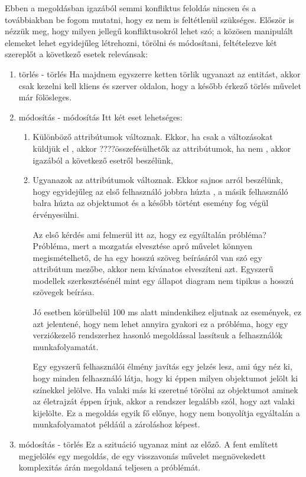 Ebben a megoldásban igazából semmi konfliktus feloldás nincsen és a továbbiakban be fogom mutatni, hogy ez nem is feltétlenül szükséges. Először is nézzük meg, hogy milyen jellegű konfliktusokról lehet szó; a közösen manipulált elemeket lehet egyidejűleg létrehozni, törölni és módosítani, feltételezve két szereplőt a következő esetek relevánsak:

\begin{enumerate}
\item { törlés - törlés} Ha majdnem egyszerre ketten törlik ugyanazt az entitást, akkor csak kezelni kell kliens és szerver oldalon, hogy a később érkező törlés művelet már fölösleges. 
\item { módosítás - módosítás} Itt két eset lehetséges:
\begin{enumerate}
\item Különböző attribútumok változnak. Ekkor, ha csak a változásokat küldjük el , akkor ????összefésülhetők az attribútumok, ha nem , akkor igazából a következő esetről beszélünk,
\item Ugyanazok az attribútumok változnak. Ekkor sajnos arról beszélünk, hogy egyidejűleg az első felhasználó jobbra 
húzta , a másik felhasználó balra húzta az objektumot és a később történt esemény fog végül érvényesülni. 

Az első kérdés ami felmerül itt az, hogy ez egyáltalán próbléma? Próbléma, mert a mozgatás elvesztése apró művelet könnyen megismételhető, de ha egy hosszú szöveg beírásáról van szó egy attribútum mezőbe, akkor nem kívánatos elveszíteni azt. Egyszerű modellek szerkesztésénél mint egy állapot diagram nem tipikus a hosszú szövegek beírása. 

Jó esetben körülbelül 100 ms alatt mindenkihez eljutnak az események, ez azt jelentené, hogy nem lehet annyira gyakori ez a próbléma, hogy egy verziókezelő rendszerhez hasonló megoldással lassítsuk a felhasználók munkafolyamatát.


Egy egyszerű felhasználói élmény javítás egy jelzés lesz, ami úgy néz ki, hogy minden felhasználó látja, hogy ki éppen milyen objektumot jelölt ki színekkel jelölve. Ha valaki más ki szeretné törölni az objektumot aminek az életrajzát éppen írjuk, akkor a rendszer legalább szól, hogy azt valaki kijelölte. Ez a megoldás egyik fő előnye, hogy nem bonyolítja egyáltalán a munkafolyamatot példáúl a zároláshoz képest.

\end{enumerate}
\item { módosítás - törlés } Ez a szituáció ugyanaz mint az előző. A fent említett megjelölés egy megoldás, de egy visszavonás művelet megnövekedett komplexitás árán megoldaná teljesen a próblémát.
\end{enumerate}

